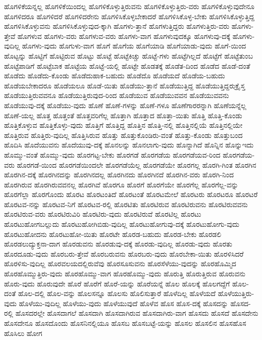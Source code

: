 {ಹೊಗಳಿಕೆಯನ್ನಲ್ಲ
ಹೊಗಳಿಕೆಯಿಂದಲ್ಲ
ಹೊಗಳಿಕೊಳ್ಳುತ್ತಿರುವನು
ಹೊಗಳಿಕೊಳ್ಳುತ್ತಿರು-ವರು
ಹೊಗಳಿಕೊಳ್ಳುವುದೇನೂ
ಹೊಗಳಿದರೂ
ಹೊಗಳಿದರೆ
ಹೊಗಳಿದರೇನು
ಹೊಗಳಿಸಿಕೊಳ್ಳಬೇಕಾದರೆ
ಹೊಗಳಿಸಿಕೊಳ್ಳ-ಬೇಕು
ಹೊಗಳಿಸಿಕೊಳ್ಳುತ್ತಿದ್ದ
ಹೊಗಳಿಸಿಕೊಳ್ಳುವನು
ಹೊಗಳಿಸಿಕೊಳ್ಳುವುದ-ಕ್ಕಾಗಿ
ಹೊಗಳು-ತ್ತಾನೆ
ಹೊಗಳುತ್ತಿದ್ದರು
ಹೊಗಳುತ್ತಿರು-ವರು
ಹೊಗಳು-ತ್ತೇವೆ
ಹೊಗಳುವ
ಹೊಗಳು-ವರು
ಹೊಗಳುವ-ವರು
ಹೊಗಳು-ವಾಗ
ಹೊಗಳುವುದಕ್ಕೂ
ಹೊಗಳುವು-ದಕ್ಕೆ
ಹೊಗಳು-ವುದಿಲ್ಲ
ಹೊಗಳು-ವುದು
ಹೊಗುಳು-ವಾಗ
ಹೊಗೆ
ಹೊಗೆಯ
ಹೊಗೆಯಾಡಿ
ಹೊಗೆಯಾಡು-ವುದು
ಹೊಗೆ-ಯಿಂದ
ಹೊಟ್ಟನ್ನು
ಹೊಟ್ಟಿಗೆ
ಹೊಟ್ಟಿರುವ
ಹೊಟ್ಟು
ಹೊಟ್ಟೆ
ಹೊಟ್ಟೆಕಿಚ್ಚು
ಹೊಟ್ಟೆ-ಗಳು
ಹೊಟ್ಟೆಗಿಲ್ಲದೆ
ಹೊಟ್ಟೆಗೆ
ಹೊಟ್ಟೆತುಂಬ
ಹೊಟ್ಟೆಪಾಡಿಗೆ
ಹೊಟ್ಟೆಬಾಕ
ಹೊಟ್ಟೆಯ
ಹೊಟ್ಟೆ-ಯಲ್ಲಿ
ಹೊಟ್ಟೇ
ಹೊಡತಕ್ಕೆ
ಹೊಡೆತ-ದಿಂದ
ಹೊಡೆದ
ಹೊಡೆ-ದಂತೆ
ಹೊಡೆದು
ಹೊಡೆದು-ಕೊಂಡು
ಹೊಡೆದುಹಾಕ-ಬಹುದು
ಹೊಡೆದೊ
ಹೊಡೆಯದೆ
ಹೊಡೆಯ-ಬಹುದು
ಹೊಡೆಯಬೇಕಾದರೂ
ಹೊಡೆಯಲೂ
ಹೊಡೆ-ಯಿತು
ಹೊಡೆಯು-ತ್ತಾನೆ
ಹೊಡೆಯುತ್ತಿದ್ದ
ಹೊಡೆಯುತ್ತಿದ್ದರುಕ್ರೈಸ್ತ
ಹೊಡೆಯುತ್ತಿರುವವನೂ
ಹೊಡೆಯುತ್ತಿರುವುದ-ರಿಂದ
ಹೊಡೆಯುವ
ಹೊಡೆಯುವವನ
ಹೊಡೆಯುವವನು
ಹೊಡೆಯುವು-ದಕ್ಕೆ
ಹೊಡೆಯು-ವುದು
ಹೊಣೆ
ಹೊಣೆ-ಗಳನ್ನು
ಹೊಣೆ-ಗಳೂ
ಹೊಣೆಗಾರರನ್ನಾಗಿ
ಹೊಣೆಯನ್ನೆಲ್ಲ
ಹೊಣೆ-ಯಲ್ಲ
ಹೊತ್ತ
ಹೊತ್ತಂತೆ
ಹೊತ್ತವರಿಗೆಲ್ಲ
ಹೊತ್ತಾಗಿ
ಹೊತ್ತಾದ
ಹೊತ್ತಾ-ಯಿತು
ಹೊತ್ತಿ
ಹೊತ್ತಿ-ಕೊಂಡು
ಹೊತ್ತಿಕೊಳ್ಳುವ
ಹೊತ್ತಿಕೊಳ್ಳು-ವುದು
ಹೊತ್ತಿಗೆ
ಹೊತ್ತಿದ್ದ
ಹೊತ್ತಿನ
ಹೊತ್ತಿ-ನಲ್ಲಿ
ಹೊತ್ತಿನಲ್ಲಿಯೆ
ಹೊತ್ತಿನಲ್ಲಿಯೇ
ಹೊತ್ತಿರುವ
ಹೊತ್ತಿರು-ವುದಿಲ್ಲ
ಹೊತ್ತಿಸಿರುವ
ಹೊತ್ತು
ಹೊತ್ತುಕೊಂಡಿರು-ವಂತೆ
ಹೊತ್ತು-ಕೊಂಡು
ಹೊತ್ತುಬಂದ
ಹೊದಿಸಿ
ಹೊದೆಯುವನು
ಹೊದೆಯುವು-ದಕ್ಕೆ
ಹೊನಲನ್ನು
ಹೊನಲಾಗು-ವುದು
ಹೊನ್ನಾಗಿದೆ
ಹೊನ್ನಿನ
ಹೊನ್ನುಇದು
ಹೊಮ್ಮು-ವಂತೆ
ಹೊಮ್ಮು-ವುದು
ಹೊರಗಟ್ಟ-ಬೇಕು
ಹೊರಗಡೆ
ಹೊರಗಡೆಯ
ಹೊರಗಡೆಯವ-ರಿಂದ
ಹೊರಗಡೆಯ-ವರು
ಹೊರಗಡೆ-ಯಿಂದ
ಹೊರಗಡೆಯಿಂದಲೇ
ಹೊರಗಡೆಯೆಲ್ಲ
ಹೊರಗಡೆಯೇ
ಹೊರಗಲ್ಲ
ಹೊರಗಿ-ಗಿಂತ
ಹೊರಗಿನ
ಹೊರಗಿನ-ದಕ್ಕೆ
ಹೊರಗಿನದನ್ನು
ಹೊರಗಿನದಲ್ಲ
ಹೊರಗಿನದು
ಹೊರಗಿನದೆ
ಹೊರಗಿನ-ವರು
ಹೊರಗಿ-ನಿಂದ
ಹೊರಗಿರುವ
ಹೊರಗಿರುವವನಲ್ಲ
ಹೊರಗಿವೆ
ಹೊರಗೂ
ಹೊರಗೆ
ಹೊರಗೆಯೇ
ಹೊರಗೆಲ್ಲ
ಹೊರಗೆಲ್ಲ-ವನ್ನು
ಹೊರಗೆಲ್ಲಾ
ಹೊರಗೊಂದು
ಹೊರಟ
ಹೊರಟಂತಿದೆ
ಹೊರಟಂತೆ
ಹೊರಟಮೇಲೆ
ಹೊರಟರು
ಹೊರಟರೂ
ಹೊರಟರೆ
ಹೊರಟವ-ನನ್ನು
ಹೊರಟವ-ನಿಗೆ
ಹೊರಟವ-ರಲ್ಲಿ
ಹೊರಟಿತು
ಹೊರಟಿರುವ
ಹೊರಟಿರುವನು
ಹೊರಟಿರುವವನು
ಹೊರಟಿರುವ-ವರು
ಹೊರಟಿರುವಿರಿ
ಹೊರಟಿರು-ವುದು
ಹೊರಟಿರುವೆ
ಹೊರಟಿಲ್ಲ
ಹೊರಟು
ಹೊರಟುಹೋಗಬಲ್ಲುದು
ಹೊರಟುಹೋಗಿಬಿಡು-ವುದಿಲ್ಲ
ಹೊರಟುಹೋಗುವು-ದಕ್ಕೆ
ಹೊರಟುಹೋಗು-ವುದು
ಹೊರಟುಹೋದನು
ಹೊರಟುಹೋ-ಯಿತು
ಹೊರಟೇ
ಹೊರಡ-ಬಹುದು
ಹೊರಡ-ಬೇಕು
ಹೊರಡಲಿ
ಹೊರಡಲುದ್ಯುಕ್ತನಾ-ದಾಗ
ಹೊರಡುವನು
ಹೊರಡುವು-ದಕ್ಕೆ
ಹೊರಡು-ವುದಿಲ್ಲ
ಹೊರಡು-ವುದು
ಹೊರತು
ಹೊರದೂಡು-ವುದು
ಹೊರಬರು-ತ್ತೇವೆ
ಹೊರಬರುವನು
ಹೊರಬರು-ವುದು
ಹೊರಬೇಕಾ-ಯಿತು
ಹೊರಳಿಸಿದರೆ
ಹೊರಳಿಸು-ವುದಿಲ್ಲ
ಹೊರವಲಯದಲ್ಲಿರುವೆವು
ಹೊರಸೂಸುವನು
ಹೊರಸೆಳೆಯು-ವುದನ್ನು
ಹೊರಹೊಮ್ಮಿದ
ಹೊರಹೊಮ್ಮುತ್ತಿರು-ವುದು
ಹೊರಹೊಮ್ಮು-ವಾಗ
ಹೊರಹೊಮ್ಮು-ವುದು
ಹೊರುತ್ತಿ
ಹೊರುತ್ತಿರುವ
ಹೊರುವನು
ಹೊರು-ವುದು
ಹೊರುವುದೇ
ಹೊರೆ
ಹೊರೆಗೆ
ಹೊರೆ-ಯನ್ನು
ಹೊರೆಯನ್ನೆ
ಹೊಲ
ಹೊಲಕ್ಕೆ
ಹೊಲಗದ್ದೆಗೆ
ಹೊಲ-ದಂತೆ
ಹೊಲ-ದಲ್ಲಿ
ಹೊಲ-ವನ್ನು
ಹೊಲಸನ್ನೂ
ಹೊಲಸು
ಹೊಲಿಸುತ್ತಾರೆ
ಹೊಳೆದಿಲ್ಲ
ಹೊಳೆಯದೆ
ಹೊಳೆಯುತ್ತಿರು-ವುದು
ಹೊಳೆಯು-ವುದಿಲ್ಲ
ಹೊಳೆಯು-ವುದು
ಹೊಳೆಯುವುದೆ
ಹೊಳೆವ
ಹೊಸ
ಹೊಸ-ದಕ್ಕೆ
ಹೊಸದನ್ನು
ಹೊಸದ-ರಲ್ಲಿ
ಹೊಸದರಲ್ಲೇ
ಹೊಸದಾಗಲೆ
ಹೊಸದಾಗಿ
ಹೊಸದಾಗಿರುವ
ಹೊಸದಾಗಿರು-ವಾಗ
ಹೊಸದು
ಹೊಸದೆ
ಹೊಸದೇನು
ಹೊಸದೇನೂ
ಹೊಸದೊಂದು
ಹೊಸನಿನಲ್ಲಿಯೂ
ಹೊಸಬ
ಹೊಸಬಟ್ಟೆ-ಯನ್ನು
ಹೊಸಲ
ಹೊಸಲಿನ
ಹೊಸಹೊಸ
ಹೊಸಿಲು
ಹೋಗ
}
